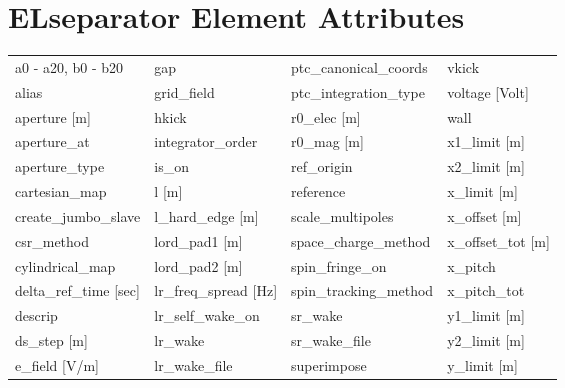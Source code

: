  \section{ELseparator Element Attributes}
 \label{s:list.elseparator}

 \begin{tabular}{llll} \toprule
a0 - a20, b0 - b20             & gap                            & ptc_canonical_coords           & vkick                          \\
alias                          & grid_field                     & ptc_integration_type           & voltage [Volt]                 \\
aperture [m]                   & hkick                          & r0_elec [m]                    & wall                           \\
aperture_at                    & integrator_order               & r0_mag [m]                     & x1_limit [m]                   \\
aperture_type                  & is_on                          & ref_origin                     & x2_limit [m]                   \\
cartesian_map                  & l [m]                          & reference                      & x_limit [m]                    \\
create_jumbo_slave             & l_hard_edge [m]                & scale_multipoles               & x_offset [m]                   \\
csr_method                     & lord_pad1 [m]                  & space_charge_method            & x_offset_tot [m]               \\
cylindrical_map                & lord_pad2 [m]                  & spin_fringe_on                 & x_pitch                        \\
delta_ref_time [sec]           & lr_freq_spread [Hz]            & spin_tracking_method           & x_pitch_tot                    \\
descrip                        & lr_self_wake_on                & sr_wake                        & y1_limit [m]                   \\
ds_step [m]                    & lr_wake                        & sr_wake_file                   & y2_limit [m]                   \\
e_field [V/m]                  & lr_wake_file                   & superimpose                    & y_limit [m]                    \\

\end{tabular}
